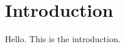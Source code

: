 \documentclass[../main.tex]{subfiles}
\begin{document}
\chapter*{Introduction}\label{chap:intro}

Hello. This is the introduction.
\end{document}
